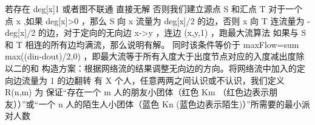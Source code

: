{}若存在\markdownRendererDollarSign{} deg[x]\markdownRendererAmpersand{}1 \markdownRendererDollarSign{}或者图不联通 直接无解\markdownRendererParagraphSeparator
{}否则我们建立源点\markdownRendererDollarSign{} S \markdownRendererDollarSign{}和汇点\markdownRendererDollarSign{} T \markdownRendererDollarSign{}\markdownRendererParagraphSeparator
{}对于一个点\markdownRendererDollarSign{} x \markdownRendererDollarSign{},如果\markdownRendererDollarSign{} deg[x]>0 \markdownRendererDollarSign{}，那么\markdownRendererDollarSign{} S \markdownRendererDollarSign{}向\markdownRendererDollarSign{} x \markdownRendererDollarSign{}流量为\markdownRendererDollarSign{} deg[x]/2 \markdownRendererDollarSign{}的边，否则\markdownRendererDollarSign{} x \markdownRendererDollarSign{}向\markdownRendererDollarSign{} T \markdownRendererDollarSign{}连流量为\markdownRendererDollarSign{} -deg[x]/2 \markdownRendererDollarSign{}的边，对于定向的无向边\markdownRendererDollarSign{} x->y \markdownRendererDollarSign{}，连边\markdownRendererDollarSign{} (x,y,1) \markdownRendererDollarSign{}，跑最大流算法\markdownRendererParagraphSeparator
{}如果与\markdownRendererDollarSign{} S \markdownRendererDollarSign{}和\markdownRendererDollarSign{} T \markdownRendererDollarSign{}相连的所有边均满流，那么说明有解。\markdownRendererParagraphSeparator
{}同时该条件等价于\markdownRendererDollarSign{} maxFlow=\markdownRendererBackslash{}sum max((din-dout)/2,0) \markdownRendererDollarSign{}，即最大流等于所有入度大于出度节点对应的入度减出度除以二的和\markdownRendererParagraphSeparator
{}构造方案：根据网络流的结果调整无向边的方向。将网络流中加入的定向边流量为\markdownRendererDollarSign{} 1 \markdownRendererDollarSign{}的边翻转\markdownRendererInterblockSeparator
{}
\markdownRendererSectionEnd 
\markdownRendererSectionEnd \markdownRendererSectionBegin
{}\markdownRendererInterblockSeparator
{}有\markdownRendererDollarSign{} X \markdownRendererDollarSign{}个人，任意两两之间认识或不认识，我们定义\markdownRendererDollarSign{} R(n,m) \markdownRendererDollarSign{}为 保证“存在一个 m 人的朋友小团体（红色 \markdownRendererDollarSign{} K\markdownRendererUnderscore{}m \markdownRendererDollarSign{}（红色边表示朋友））”或“一个 n 人的陌生人小团体（蓝色 \markdownRendererDollarSign{} K\markdownRendererUnderscore{}n \markdownRendererDollarSign{}(蓝色边表示陌生)）”所需要的最小派对人数\markdownRendererParagraphSeparator
